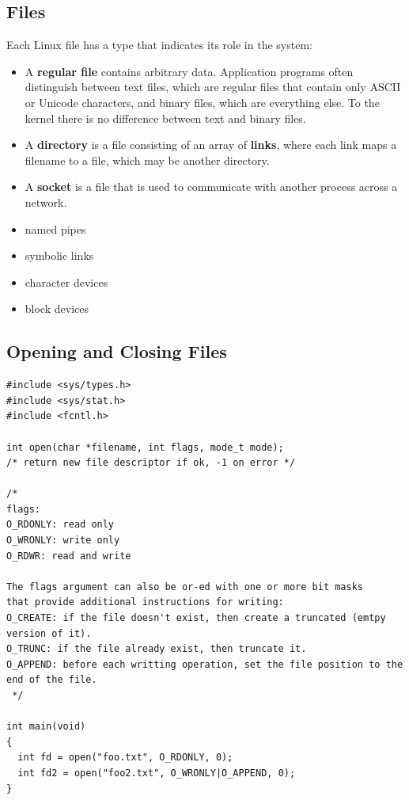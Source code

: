 \documentclass[11pt]{article}
\begin{document}
\subsection{Files}
\label{sec:orgb04021f}
Each Linux file has a type that indicates its role in the system:\\
\begin{itemize}
\item A \textbf{regular file} contains arbitrary data. Application programs often distinguish between text files, which are regular files that contain only ASCII or Unicode characters, and binary files, which are everything else. To the kernel there is no difference between text and binary files.\\
\item A \textbf{directory} is a file consisting of an array of \textbf{links}, where each link maps a filename to a file, which may be another directory.\\
\item A \textbf{socket} is a file that is used to communicate with another process across a network.\\
\item named pipes\\
\item symbolic links\\
\item character devices\\
\item block devices\\
\end{itemize}


\subsection{Opening and Closing Files}
\label{sec:org5b90513}

\begin{verbatim}
#include <sys/types.h>
#include <sys/stat.h>
#include <fcntl.h>

int open(char *filename, int flags, mode_t mode);
/* return new file descriptor if ok, -1 on error */

/* 
flags:
O_RDONLY: read only
O_WRONLY: write only
O_RDWR: read and write

The flags argument can also be or-ed with one or more bit masks
that provide additional instructions for writing:
O_CREATE: if the file doesn't exist, then create a truncated (emtpy version of it).
O_TRUNC: if the file already exist, then truncate it.
O_APPEND: before each writting operation, set the file position to the end of the file.
 */

int main(void)
{
  int fd = open("foo.txt", O_RDONLY, 0);
  int fd2 = open("foo2.txt", O_WRONLY|O_APPEND, 0);
}

\end{verbatim}
\end{document}
